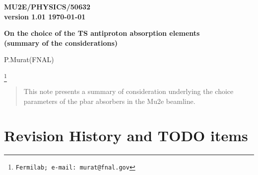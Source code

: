 \documentclass[12pt]{article}
\begin{document}
\begin{titlepage}
  \begin{flushright}
    \bf {MU2E/PHYSICS/50632} \\
    version 1.01
    \today
 \end{flushright}

  \vspace{1cm}

  \begin{center}
    {\Large \bf On the choice of the TS antiproton absorption elements \\

      \vspace{0.3in}
      (summary of the considerations)
    }

    \vspace{1cm}
    P.Murat(FNAL)

    \footnote{\texttt{Fermilab; e-mail: murat@fnal.gov}}
    \vspace{0.3cm}

    \vspace{0.8cm}
  \end{center}

  \begin{abstract}
    \vspace{0.2in}
    This note presents a summary of consideration underlying the choice
    parameters of the pbar absorbers in the Mu2e beamline.
  \end{abstract}

\end{titlepage}
%
%
%
{\tableofcontents}

% 


\newpage
\section {Revision History and TODO items}
\end{document}
